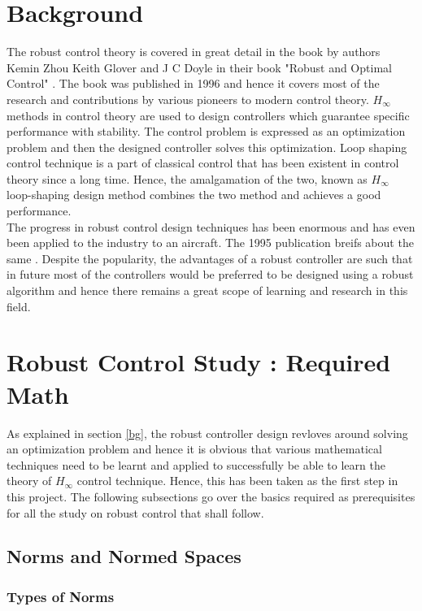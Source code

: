 \documentclass[a4paper,12pt]{article}
\begin{document}
\section{Background}
The robust control theory is covered in great detail in the book by authors Kemin Zhou Keith Glover and J C Doyle in their book "Robust and Optimal Control" \cite{book}. The book was published in 1996 and hence it covers most of the research and contributions by various pioneers to modern control theory. $H_{\infty}$ methods in control theory are used to design controllers which guarantee specific performance with stability. The control problem is expressed as an optimization problem and then the designed controller solves this optimization. Loop shaping control technique is a part of classical control that has been existent in control theory since a long time. Hence, the amalgamation of the two, known as $H_{\infty}$ loop-shaping design method combines the two method and achieves a good performance. \\
The progress in robust control design techniques has been enormous and has even been applied to the industry to an aircraft. The 1995 publication breifs about the same \cite{aero}. Despite the popularity, the advantages of a robust controller are such that in future most of the controllers would be preferred to be designed using a robust algorithm and hence there remains a great scope of learning and research in this field. \\
\label{bg}
\section{Robust Control Study : Required Math}

As explained in section \ref{bg}, the robust controller design revloves around solving an optimization problem and hence it is obvious that various mathematical techniques need to be learnt and applied to successfully be able to learn the theory of $H_{\infty}$ control technique. Hence, this has been taken as the first step in this project. The following subsections go over the basics required as prerequisites for all the study on robust control that shall follow.
	\subsection{Norms and Normed Spaces}
	
		\subsubsection{Types of Norms}
\end{document}

